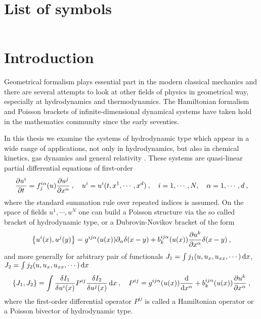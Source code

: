 \chapter*{List of symbols}
\noindent\vspace{-2\baselineskip}
{\renewcommand{\arraystretch}{1.3}
\begin{table}[h!]
    \begin{tabular}{c|p{0.7\linewidth}}
    \end{tabular}
\end{table}
}

\chapter*{Introduction}

Geometrical formalism plays essential part in the modern classical mechanics and there are several attempts to look at other fields of physics in geometrical way, especially at hydrodynamics and thermodynamics. The Hamiltonian formalism and Poisson brackets of infinite-dimensional dynamical systems have taken hold in the mathematics community since the early seventies.

In this thesis we examine the systems of hydrodynamic type which appear in a wide range of applications, not only in hydrodynamics, but also in chemical kinetics, gas dynamics and general relativity \cite{Savoldi}. These systems are quasi-linear partial differential equations of first-order
\begin{align}
    \frac{\partial u^i}{\partial t} = f^{i \alpha}_j(u) \frac{\partial u^j}{\partial x^\alpha} \:, \quad u^i=u^i(t, x^1, \cdots, x^d) \:, \quad i = 1, \cdots, N, \quad \alpha = 1, \cdots, d \:,
\end{align}
where the standard summation rule over repeated indices is assumed. On the space of fields $u^1, \cdots, u^N$ one can build a Poisson structure via the so called bracket of hydrodynamic type, or a Dubrovin-Novikov bracket of the form
\begin{align}
    \left \lbrace u^i(x),u^j(y) \right \rbrace = g^{ij \alpha}(u(x)) \partial_\alpha \delta(x-y) + b^{ij \alpha}_k (u(x)) \frac{\partial u^k}{\partial x^\alpha} \delta(x-y) \:,
\end{align}
and more generally for arbitrary pair of functionals $J_1 = \int j_1(u,u_x,u_{xx},\cdots) \, \mathrm{d} x$, $J_2 = \int j_2(u,u_x,u_{xx},\cdots) \, \mathrm{d} x$
\begin{align}
    \left \lbrace J_1, J_2 \right \rbrace = \int \frac{\delta I_1}{\delta u^i(x)} P^{ij} \frac{\delta I_2}{\delta u^j(x)} \, \mathrm{d} x \:, \quad P^{ij} = g^{ij \alpha}(u(x)) \frac{\mathrm{d}}{\mathrm{d}x^\alpha} + b^{ij \alpha}_k(u(x)) \frac{\partial u^k}{\partial x^\alpha} \:,
\end{align}
where the first-order differential operator $P^{ij}$ is called a Hamiltonian operator or a Poisson bivector of hydrodynamic type. 


